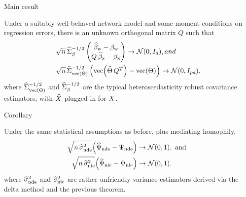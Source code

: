 \documentclass[aspectratio=169]{beamer}
\theoremstyle{remark}
\begin{document}
\begin{frame}{Main result}

    \begin{theorem}

        \vspace{2mm}

        Under a suitably well-behaved network model and some moment conditions on regression errors, there is an unknown orthogonal matrix $Q$ such that
        \begin{equation*}
            \begin{aligned}
                \sqrt{ n } \,
                 & \Sigmahatbeta^{-1/2}
                \begin{pmatrix}
                    \betawhat - \betaw \\
                    Q \, \betaxhat - \betax
                \end{pmatrix}
                \to
                \Normal{0}{I_d}, and     \\
                \sqrt{ n } \,
                 & \Sigmahattheta^{-1/2}
                \begin{pmatrix}
                    \vecc \paren*{\Thetahat \, Q^T} - \Thetavec
                \end{pmatrix}
                \to
                \Normal{0}{I_{p d}}.
            \end{aligned}
        \end{equation*}
        \noindent where $\widehat{\Sigma}_{\operatorname*{vec} \left(\Theta\right)}^{-1/2}$ and $\widehat{\Sigma}_\beta^{-1/2}$ are the typical heteroscedasticity robust covariance estimators, with $\widehat{X}$ plugged in for $X$.
    \end{theorem}
\end{frame}

\begin{frame}{Corollary}

    \begin{theorem}

        \vspace{2mm}

        Under the same statistical assumptions as before, plus mediating homophily,
        \begin{align*}
            \sqrt{n \, \sigmahatnde} \paren*{\ndehat - \nde}
             & \to
            \Normal{0}{1}, \text { and } \\
            \sqrt{n \, \sigmahatnie} \paren*{\niehat - \nie}
             & \to
            \Normal{0}{1}.
        \end{align*}
        \noindent where $\widehat{\sigma}^2_\mathrm{nde}$ and $\widehat{\sigma}^2_\mathrm{nie}$ are rather unfriendly variance estimators derived via the delta method and the previous theorem.

    \end{theorem}

\end{frame}
\end{document}
